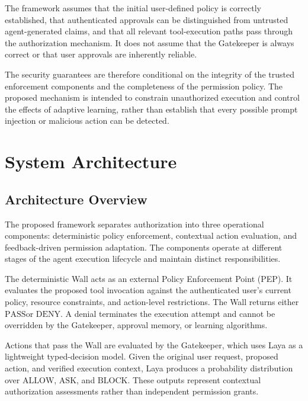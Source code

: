 \documentclass[10pt,conference]{IEEEtran}
\newcommand{\Allow}{\ensuremath{\mathrm{ALLOW}}}
\newcommand{\Ask}{\ensuremath{\mathrm{ASK}}}
\newcommand{\Block}{\ensuremath{\mathrm{BLOCK}}}
\newcommand{\Pass}{\ensuremath{\mathrm{PASS}}}
\newcommand{\Deny}{\ensuremath{\mathrm{DENY}}}
\begin{document}
The framework assumes that the initial user-defined policy is correctly established, that authenticated approvals can be distinguished from untrusted agent-generated claims, and that all relevant tool-execution paths pass through the authorization mechanism. It does not assume that the Gatekeeper is always correct or that user approvals are inherently reliable.

The security guarantees are therefore conditional on the integrity of the trusted enforcement components and the completeness of the permission policy. The proposed mechanism is intended to constrain unauthorized execution and control the effects of adaptive learning, rather than establish that every possible prompt injection or malicious action can be detected.



\section{System Architecture}
\label{sec:architecture}

\subsection{Architecture Overview}

The proposed framework separates authorization into three operational components: deterministic policy enforcement, contextual action evaluation, and feedback-driven permission adaptation. The components operate at different stages of the agent execution lifecycle and maintain distinct responsibilities.

The deterministic Wall acts as an external Policy Enforcement Point (PEP). It evaluates the proposed tool invocation against the authenticated user's current policy, resource constraints, and action-level restrictions. The Wall returns either \Pass or \Deny. A denial terminates the execution attempt and cannot be overridden by the Gatekeeper, approval memory, or learning algorithms.

Actions that pass the Wall are evaluated by the Gatekeeper, which uses Laya as a lightweight typed-decision model. Given the original user request, proposed action, and verified execution context, Laya produces a probability distribution over \Allow, \Ask, and \Block. These outputs represent contextual authorization assessments rather than independent permission grants.
\end{document}
